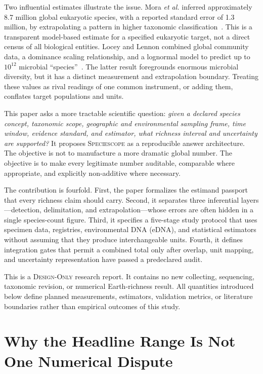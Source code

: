 \documentclass[conference]{IEEEtran}
\newcommand{\specscope}{\textsc{Speciescope}}
\newcommand{\designonly}{\textsc{Design-Only}}
\begin{document}
Two influential estimates illustrate the issue. Mora \emph{et al.} inferred approximately 8.7 million global eukaryotic species, with a reported standard error of 1.3 million, by extrapolating a pattern in higher taxonomic classification~\cite{mora2011}. This is a transparent model-based estimate for a specified eukaryotic target, not a direct census of all biological entities. Locey and Lennon combined global community data, a dominance scaling relationship, and a lognormal model to predict up to $10^{12}$ microbial ``species''~\cite{locey2016}. The latter result foregrounds enormous microbial diversity, but it has a distinct measurement and extrapolation boundary. Treating these values as rival readings of one common instrument, or adding them, conflates target populations and units.

This paper asks a more tractable scientific question: \emph{given a declared species concept, taxonomic scope, geographic and environmental sampling frame, time window, evidence standard, and estimator, what richness interval and uncertainty are supported?} It proposes \specscope{} as a reproducible answer architecture. The objective is not to manufacture a more dramatic global number. The objective is to make every legitimate number auditable, comparable where appropriate, and explicitly non-additive where necessary.

The contribution is fourfold. First, the paper formalizes the estimand passport that every richness claim should carry. Second, it separates three inferential layers---detection, delimitation, and extrapolation---whose errors are often hidden in a single species-count figure. Third, it specifies a five-stage study protocol that uses specimen data, registries, environmental DNA (eDNA), and statistical estimators without assuming that they produce interchangeable units. Fourth, it defines integration gates that permit a combined total only after overlap, unit mapping, and uncertainty representation have passed a predeclared audit.

This is a \designonly{} research report. It contains no new collecting, sequencing, taxonomic revision, or numerical Earth-richness result. All quantities introduced below define planned measurements, estimators, validation metrics, or literature boundaries rather than empirical outcomes of this study.

\section{Why the Headline Range Is Not One Numerical Dispute}
\end{document}
